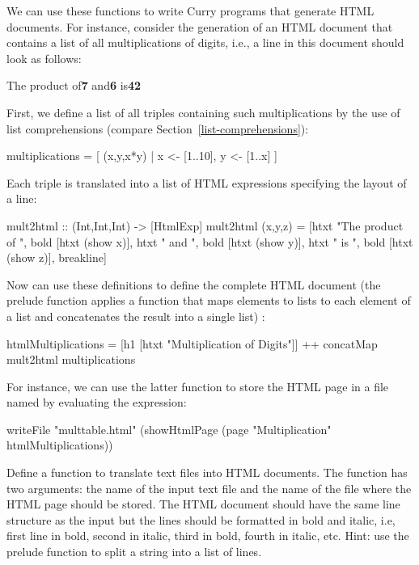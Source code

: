 %
We can use these functions to write Curry programs that generate
HTML documents. For instance, consider the generation of an HTML
document that contains a list of all multiplications of digits,
i.e., a line in this document should look as follows:
\begin{prog}
{\rm The product of{\bf 7} and{\bf 6} is{\bf 42}}
\end{prog}
First, we define a list of all triples containing such multiplications
by the use of list comprehensions (compare Section~\ref{list-comprehensions}):
\begin{prog}
multiplications = [ (x,y,x*y) | x <- [1..10], y <- [1..x] ]
\end{prog}
Each triple is translated into a list of HTML expressions specifying the
layout of a line:
\begin{prog}
mult2html :: (Int,Int,Int) -> [HtmlExp]
mult2html (x,y,z) =
 [htxt "The product of ", bold [htxt (show x)],
  htxt " and ", bold [htxt (show y)],
  htxt " is ", bold [htxt (show z)], breakline]
\end{prog}
Now can use these definitions to define the complete
HTML document
(the prelude function 
applies a function that maps elements to lists to each element of a list
and concatenates the result into a single list)
:
\begin{prog}
htmlMultiplications =
 [h1 [htxt "Multiplication of Digits"]] ++ concatMap mult2html multiplications
\end{prog}
For instance, we can use the latter function to store the HTML page
in a file named  by evaluating the expression:
\begin{prog}
writeFile "multtable.html"
          (showHtmlPage (page "Multiplication" htmlMultiplications))
\end{prog}
%
\begin{exercise}
Define a function  to translate text files
into HTML documents.
The function has two arguments: the name of the input text file
and the name of the file where the HTML page should
be stored. The HTML document should have the same line structure
as the input but the lines should be formatted in bold and italic, i.e,
first line in bold, second in italic, third in bold, fourth in italic, etc.
Hint: use the prelude function 
to split a string into a list of lines.
\end{exercise}


